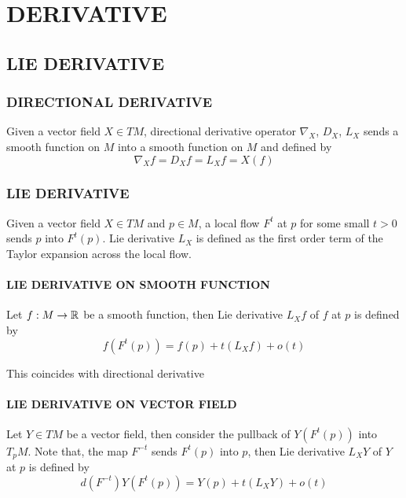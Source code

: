 \chapter{DERIVATIVE}

\section{LIE DERIVATIVE}

\subsection{DIRECTIONAL DERIVATIVE}

\begin{definition}
	Given a vector field $X \in TM$, directional derivative operator $\nabla_X$, $D_X$, $L_X$ sends a smooth function on $M$ into a smooth function on $M$ and defined by
	$$
		\nabla_X f = D_X f = L_X f = X(f)
	$$
\end{definition}

\subsection{LIE DERIVATIVE}

Given a vector field $X \in TM$ and $p \in M$, a local flow $F^t$ at $p$ for some small $t > 0$ sends $p$ into $F^t(p)$. Lie derivative $L_X$ is defined as the first order term of the Taylor expansion across the local flow.

\subsubsection{LIE DERIVATIVE ON SMOOTH FUNCTION}

Let $f: M \to \mathbb{R}$ be a smooth function, then  Lie derivative $L_X f$ of $f$ at $p$ is defined by
$$
	f(F^t(p)) = f(p) + t (L_X f) + o(t)
$$

This coincides with directional derivative


\subsubsection{LIE DERIVATIVE ON VECTOR FIELD}

Let $Y \in TM$ be a vector field, then consider the pullback of $Y(F^t(p))$ into $T_p M$. Note that, the map $F^{-t}$ sends $F^t(p)$ into $p$, then Lie derivative $L_X Y$ of $Y$ at $p$ is defined by
$$
	d(F^{-t}) Y(F^t(p)) = Y(p) + t (L_X Y) + o(t)
$$

